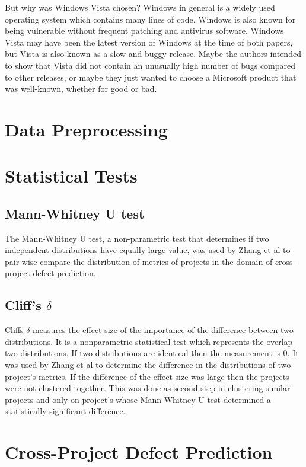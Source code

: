 \documentclass{sig-alternate-05-2015}
\begin{document}
But why was Windows Vista chosen? Windows in general is a widely used operating system which contains many lines of code. Windows is also known for being vulnerable without frequent patching and antivirus software. Windows Vista may have been the latest version of Windows at the time of both papers, but Vista is also known as a slow and buggy release. Maybe the authors intended to show that Vista did not contain an unusually high number of bugs compared to other releases, or maybe they just wanted to choose a Microsoft product that was well-known, whether for good or bad.


\section{Data Preprocessing}

\section{Statistical Tests}
\subsection{Mann-Whitney U test}
The Mann-Whitney U test, a non-parametric test that determines if two independent distributions have equally large value,  was used by Zhang et al \cite{Zhang:2014:TBU:2597073.2597078} to pair-wise compare the distribution of metrics of projects in the domain of cross-project defect prediction.

\subsection{Cliff's $\delta$}
Cliffs $\delta$ measures the effect size of the importance of the difference between two distributions. It is a nonparametric statistical test which represents the overlap two distributions. If two distributions are identical then the measurement is 0.  It was used by Zhang et al \cite{Zhang:2014:TBU:2597073.2597078} to determine the difference in the distributions of two project's metrics. If the difference of the effect size was large then the projects were not clustered together.  This was done as second step in clustering similar projects and only on project's whose Mann-Whitney U test determined a statistically significant difference. 


\section{Cross-Project Defect Prediction}
\end{document}
